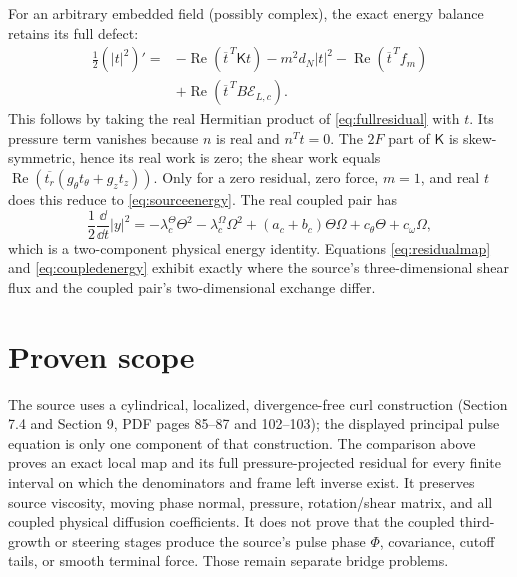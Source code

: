 For an arbitrary embedded field (possibly complex), the exact energy balance
retains its full defect:
\begin{equation}
 \begin{split}
 \frac12(|t|^2)'={}&-\operatorname{Re}(\overline t^{\,T}\mathsf Kt)
 -m^2d_N|t|^2-\operatorname{Re}(\overline t^{\,T}f_m)\\
 &+\operatorname{Re}(\overline t^{\,T}B\mathcal E_{L,c}).
 \end{split}
\end{equation}
This follows by taking the real Hermitian product of
\eqref{eq:fullresidual} with $t$. Its pressure term vanishes because $n$ is
real and $n^Tt=0$. The $2F$ part of $\mathsf K$ is skew-symmetric, hence
its real work is zero; the shear work equals
$\operatorname{Re}(\overline{t_r}(g_\theta t_\theta+g_z t_z))$.
Only for a zero residual, zero force, $m=1$, and real $t$ does this reduce
to \eqref{eq:sourceenergy}. The real coupled pair has
\begin{equation}
 \frac12\frac{\dd}{\dd t}|y|^2
 =-\lambda_c^\Theta\Theta^2-\lambda_c^\Omega\Omega^2
 +(a_c+b_c)\Theta\Omega+c_\theta\Theta+c_\omega\Omega,
 \label{eq:coupledenergy}
\end{equation}
which is a two-component physical energy identity.  Equations
\eqref{eq:residualmap} and \eqref{eq:coupledenergy} exhibit exactly where the
source's three-dimensional shear flux and the coupled pair's two-dimensional
exchange differ.

\section{Proven scope}
The source uses a cylindrical, localized, divergence-free curl construction
(Section 7.4 and Section 9, PDF pages 85--87 and 102--103); the displayed
principal pulse equation is only one component of that construction.  The
comparison above proves an exact local map and its full pressure-projected
residual for every finite interval on which the denominators and frame left
inverse exist.  It preserves source viscosity, moving phase normal, pressure,
rotation/shear matrix, and all coupled physical diffusion coefficients.  It does
not prove that the coupled third-growth or steering stages produce the source's
pulse phase $\Phi$, covariance, cutoff tails, or smooth terminal force.  Those
remain separate bridge problems.


